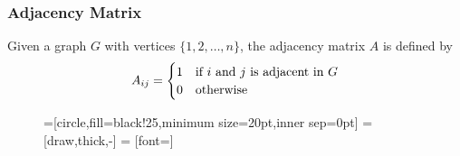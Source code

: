 \documentclass{beamer}
\begin{document}
                  \begin{frame}
                        \frametitle{Adjacency Matrix}
                        \begin{definition}\label{def:adjacencyMatrix}
                              Given a graph $ G $ with vertices $\{1,2,\dots,n\}$, the adjacency matrix $ A $ is defined by
                              \begin{equation}
                                    A_{ij} = \begin{cases}
                                          1 & \text{if $ i $ and $ j $ is adjacent in $ G $} \\
                                          0 & \text{otherwise}
                                    \end{cases}
                              \end{equation}
                        \end{definition}
                        \begin{multicols}{2}
                              \begin{figure}[h!]
                                    =[circle,fill=black!25,minimum size=20pt,inner sep=0pt]
                                     = [draw,thick,-]
                                     = [font=\small]


\end{figure}
\end{multicols}
\end{frame}
\end{document}
